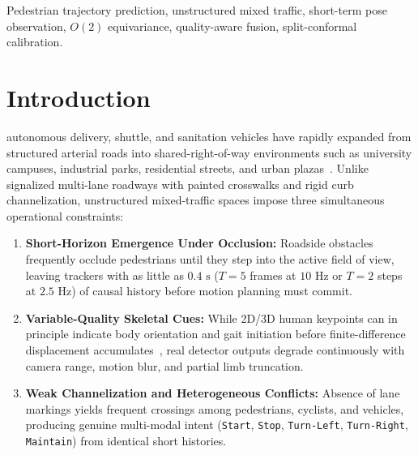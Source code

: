 \documentclass[journal]{IEEEtran}
\begin{document}
\begin{abstract}
Representation-decoupled 5-action Platt reranking (\texttt{U\_M3\_decoupled\_platt\_rerank}) achieves $0.4505 / 1.0085\text{ m}$ on \texttt{PINNS} ($\text{Macro-AP}=0.4051$) and $0.2917 / 0.5638\text{ m}$ on \texttt{JRDB} ($\text{ECE}=0.0053$). (5) Without post-calibration predictor retraining, split-conformal tubes achieve $90.60\% / 94.94\%$ (\texttt{PINNS} within-site), $89.76\% / 95.50\%$ (\texttt{DUT} 72-pair), and $89.51\% / 94.21\%$ (\texttt{IMPTC} 12-pair) \texttt{Union-6} coverage, while source-OOF locally-weighted scaling lifts \texttt{JRDB} 72-pair cross-location coverage from $86.77\% / 92.81\%$ to $88.89\% / 94.20\%$ ($-55.8\% / -52.5\%$ radius vs.\ \texttt{CV}).
\end{abstract}

\begin{IEEEkeywords}
Pedestrian trajectory prediction, unstructured mixed traffic, short-term pose observation, $O(2)$ equivariance, quality-aware fusion, split-conformal calibration.
\end{IEEEkeywords}

\section{Introduction}
 autonomous delivery, shuttle, and sanitation vehicles have rapidly expanded from structured arterial roads into shared-right-of-way environments such as university campuses, industrial parks, residential streets, and urban plazas~\cite{rasouli2020av,rudenko2020survey,korbmacher2022review}. Unlike signalized multi-lane roadways with painted crosswalks and rigid curb channelization, unstructured mixed-traffic spaces impose three simultaneous operational constraints:
\begin{enumerate}
  \item \textbf{Short-Horizon Emergence Under Occlusion:} Roadside obstacles frequently occlude pedestrians until they step into the active field of view, leaving trackers with as little as $0.4\text{ s}$ ($T = 5$ frames at $10\text{ Hz}$ or $T = 2$ steps at $2.5\text{ Hz}$) of causal history before motion planning must commit.
  \item \textbf{Variable-Quality Skeletal Cues:} While 2D/3D human keypoints can in principle indicate body orientation and gait initiation before finite-difference displacement accumulates~\cite{salzmann2023hst,saadatnejad2024transmotion}, real detector outputs degrade continuously with camera range, motion blur, and partial limb truncation.
  \item \textbf{Weak Channelization and Heterogeneous Conflicts:} Absence of lane markings yields frequent crossings among pedestrians, cyclists, and vehicles, producing genuine multi-modal intent (\texttt{Start}, \texttt{Stop}, \texttt{Turn-Left}, \texttt{Turn-Right}, \texttt{Maintain}) from identical short histories.
\end{enumerate}
\end{document}
